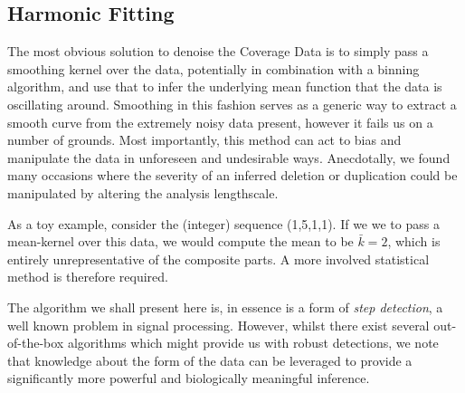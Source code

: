 \documentclass[fleqn,usenatbib]{mnras}
\begin{document}
		\subsection{Harmonic Fitting}
			
			{The most obvious solution to denoise the Coverage Data is to simply pass a smoothing kernel over the data, potentially in combination with a binning algorithm, and use that to infer the underlying mean function that the data is oscillating around. Smoothing in this fashion serves as a generic way to extract a smooth curve from the extremely noisy data present, however it fails us on a number of grounds. Most importantly, this method can act to bias and manipulate the data in unforeseen and undesirable ways. Anecdotally, we found many occasions where the severity of an inferred deletion or duplication could be manipulated by altering the analysis lengthscale. }
			
			As a toy example, consider the (integer) sequence (1,5,1,1). If we we to pass a mean-kernel over this data, we would compute the mean to be $\bar{k}=2$, which is entirely unrepresentative of the composite parts.  A more involved statistical method is therefore required.
			
			The algorithm we shall present here is, in essence is a form of \textit{step detection}, a well known problem in signal processing. However, whilst there exist several out-of-the-box algorithms which might provide us with robust detections, we note that knowledge about the form of the data can be leveraged to provide a significantly more powerful and biologically meaningful inference. 
			
			

	
				
\end{document}
